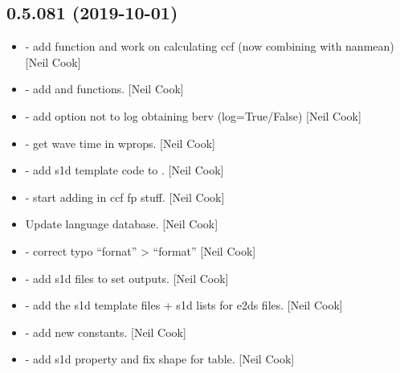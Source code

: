\documentclass[a4paper,10pt,english]{report}
\begin{document}
\subsection{0.5.081 (2019-10-01)}
\label{\detokenize{misc/changelog:id62}}\begin{itemize}
\item {} 
 - add  function and
work on calculating ccf (now combining with nanmean) {[}Neil Cook{]}

\item {} 
 - add  and
 functions. {[}Neil Cook{]}

\item {} 
 - add option not to log obtaining berv
(log=True/False) {[}Neil Cook{]}

\item {} 
 - get wave time in wprops. {[}Neil Cook{]}

\item {} 
 - add s1d template code to
. {[}Neil Cook{]}

\item {} 
 - start adding in ccf fp stuff. {[}Neil
Cook{]}

\item {} 
Update language database. {[}Neil Cook{]}

\item {} 
 - correct typo “fornat” \textendash{}\textgreater{} “format” {[}Neil Cook{]}

\item {} 
 - add s1d files to set
outputs. {[}Neil Cook{]}

\item {} 
 - add the s1d template
files + s1d lists for e2ds files. {[}Neil Cook{]}

\item {} 
 - add new 
constants. {[}Neil Cook{]}

\item {} 
 - add s1d property and fix shape for table.
{[}Neil Cook{]}

\end{itemize}
\end{document}
